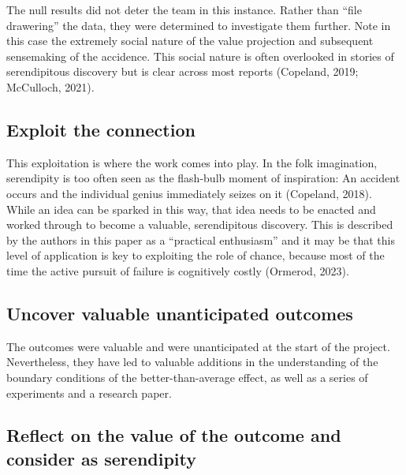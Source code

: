 \documentclass[authordate, commentary]{jote-new-article}
\begin{document}
	The null results did not deter the team in this instance. Rather than “file drawering” the data, they were determined to investigate them further. Note in this case the extremely social nature of the value projection and subsequent sensemaking of the accidence. This social nature is often overlooked in stories of serendipitous discovery but is clear across most reports (Copeland, 2019; McCulloch, 2021). 



	\subsection{Exploit the connection}



    This exploitation is where the work comes into play. In the folk imagination, serendipity is too often seen as the flash-bulb moment of inspiration: An accident occurs and the individual genius immediately seizes on it (Copeland, 2018). While an idea can be sparked in this way, that idea needs to be enacted and worked through to become a valuable, serendipitous discovery. This is described by the authors in this paper as a “practical enthusiasm” and it may be that this level of application is key to exploiting the role of chance, because most of the time the active pursuit of failure is cognitively costly (Ormerod, 2023).



	\subsection{Uncover valuable unanticipated outcomes}



	The outcomes were valuable and were unanticipated at the start of the project. Nevertheless, they have led to valuable additions in the understanding of the boundary conditions of the better-than-average effect, as well as a series of experiments and a research paper.



	\subsection{Reflect on the value of the outcome and consider as serendipity}
\end{document}
